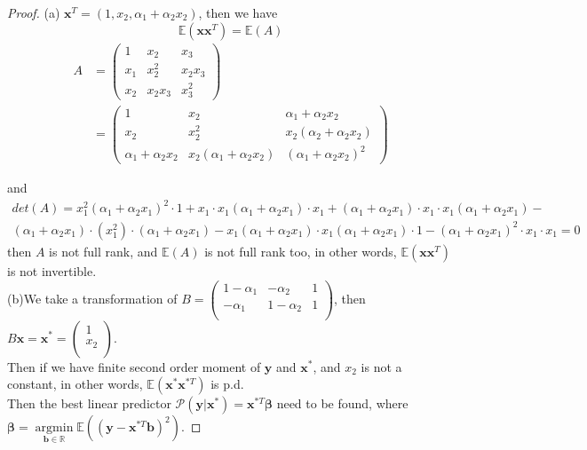 \documentclass[12pt]{article}
\DeclareMathOperator*{\argmin}{argmin}
\begin{document}
\begin{proof}
(a) $\mathbf{x}^T = (1,x_2,\alpha_1+\alpha_2x_2)$, then we have
$$\mathbb{E}(\mathbf{xx}^T) = \mathbb{E}(A)$$
\begin{align*}
A &= \begin{pmatrix} 1&x_2& x_3\\
x_1&x_2^2&x_2x_3\\
x_2&x_2x_3&x_3^2
\end{pmatrix}\\
&=\begin{pmatrix} 1&x_2& \alpha_1+\alpha_2x_2\\
x_2&x_2^2&x_2(\alpha_2+\alpha_2x_2)\\
\alpha_1+\alpha_2x_2&x_2(\alpha_1+\alpha_2x_2)&(\alpha_1+\alpha_2x_2)^2
\end{pmatrix}
\end{align*}

and
\begin{multline}
    det(A) = x_1^2(\alpha_1+\alpha_2x_1)^2\cdot 1+x_1\cdot x_1(\alpha_1+\alpha_2x_1)\cdot x_1 +(\alpha_1+\alpha_2x_1)\cdot x_1 \cdot x_1(\alpha_1+\alpha_2x_1)- \\ (\alpha_1+\alpha_2x_1)\cdot(x_1^2)\cdot(\alpha_1+\alpha_2x_1) - x_1(\alpha_1+\alpha_2x_1) \cdot x_1(\alpha_1+\alpha_2x_1)\cdot 1-(\alpha_1+\alpha_2x_1)^2 \cdot x_1 \cdot x_1 = 0
\end{multline}
then $A$ is not full rank, and $\mathbb{E}(A)$ is not full rank too, in other words, $\mathbb{E}(\mathbf{xx}^T)$ is not invertible.\\


(b)We take a transformation of $B = \begin{pmatrix}
1-\alpha_1&-\alpha_2&1\\
-\alpha_1&1-\alpha_2&1\\
\end{pmatrix}$, then $B\mathbf{x} = \mathbf{x^*} = \begin{pmatrix}
1\\
x_2\\
\end{pmatrix}$.\\
Then if we have finite second order moment of $\mathbf{y}$ and $\mathbf{x}^*$, and $x_2$ is not a constant, in other words,
$\mathbb{E}(\mathbf{x}^*\mathbf{x}^{*T})$ is p.d.\\
Then the best linear predictor $\mathcal{P}(\mathbf{y}|\mathbf{x}^*) = \mathbf{x}^{*T}\boldsymbol{\beta}$ need to be found, where $\boldsymbol{\beta} = \argmin\limits_{\mathbf{b}\in \mathbb{R}}\mathbb{E}((\mathbf{y}-\mathbf{x}^{*T}\mathbf{b})^2) $.


\end{proof}
\end{document}
